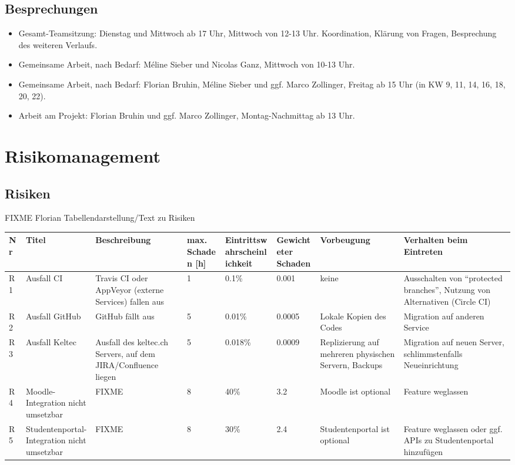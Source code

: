 \documentclass[a4paper]{article}
\let\oldsection\section
\renewcommand\section{\clearpage\oldsection}
\begin{document}
\subsection{Besprechungen}
\begin{itemize}
\item Gesamt-Teamsitzung: Dienstag und Mittwoch ab 17 Uhr, Mittwoch von 12-13 Uhr. Koordination, Klärung von Fragen, Besprechung des weiteren Verlaufs.
\item Gemeinsame Arbeit, nach Bedarf: Méline Sieber und Nicolas Ganz, Mittwoch von 10-13 Uhr.
\item Gemeinsame Arbeit, nach Bedarf: Florian Bruhin, Méline Sieber und ggf. Marco Zollinger, Freitag ab 15 Uhr (in KW 9, 11, 14, 16, 18, 20, 22).
\item Arbeit am Projekt: Florian Bruhin und ggf. Marco Zollinger, Montag-Nachmittag ab 13 Uhr.
\end{itemize}

\section{Risikomanagement}
\begin{landscape}
\subsection{Risiken}

FIXME Florian Tabellendarstellung/Text zu Risiken
\thispagestyle{empty}

\begin{tabular}{ll>{\raggedright}p{8em}lll>{\raggedright}p{8em}p{15em}}
  \toprule
  Nr & Titel & Beschreibung & max. Schaden [h] & Eintrittswahrscheinlichkeit & Gewichteter Schaden & Vorbeugung & Verhalten beim Eintreten \\
  \midrule
  R1 & Ausfall CI & Travis CI oder AppVeyor (externe Services) fallen aus & 1 & 0.1\% & 0.001 & keine & Ausschalten von ``protected branches'', Nutzung von Alternativen (Circle CI) \\
  R2 & Ausfall GitHub & GitHub fällt aus & 5 & 0.01\% & 0.0005 & Lokale Kopien des Codes & Migration auf anderen Service \\
  R3 & Ausfall Keltec & Ausfall des keltec.ch Servers, auf dem JIRA/Confluence liegen & 5 & 0.018\% & 0.0009 & Replizierung auf mehreren physischen Servern, Backups & Migration auf neuen Server, schlimmstenfalls Neueinrichtung \\
  R4 & Moodle-Integration nicht umsetzbar & FIXME & 8 & 40\% & 3.2 & Moodle ist optional & Feature weglassen \\
  R5 & Studentenportal-Integration nicht umsetzbar & FIXME & 8 & 30\% & 2.4 & Studentenportal ist optional & Feature weglassen oder ggf. APIs zu Studentenportal hinzufügen \\
  \bottomrule
\end{tabular}
\end{landscape}
\end{document}
